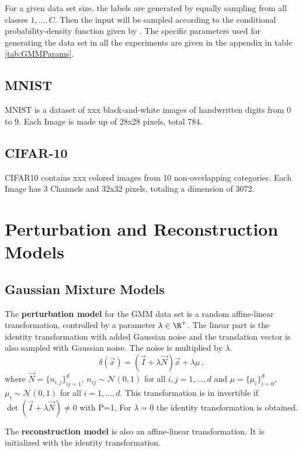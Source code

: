 For a given data set size, the labels are generated by equally sampling from all classes $1, \ldots, C$.
Then the input will be sampled according to the conditional probability-density function given by .
The specific parameters used for generating the data set in all the experiments
are given in the appendix  in table \ref{tab:GMMParams}.



\subsection{MNIST}
MNIST is a dataset of xxx black-and-white images of handwritten digits from 0 to 9. 
Each Image is made up of 28x28 pixels, total 784.

\subsection{CIFAR-10}
CIFAR10 contains xxx colored images from 10 non-overlapping categories.
Each Image has 3 Channels and 32x32 pixels, totaling a dimension of 3072.





\section{Perturbation and Reconstruction Models}


\subsection{Gaussian Mixture Models}

The \textbf{perturbation model} for the GMM data set is
a random affine-linear transformation, controlled by a parameter $\lambda \in \R^+$.
The linear part is the identity transformation with added Gaussian noise
and the translation vector is also sampled with Gaussian noise.
The noise is multiplied by $\lambda$.
\[
    \delta(\vec x) = (\vec I + \lambda \vec N)\vec x + \lambda \mu \,,
\]
where $\vec N = \{n_{i, j}\}_{i j = 1}^{d}$, $n_{ij} \sim \mathcal N (0, 1)$ for all $i, j = 1 , \ldots, d$
and 
$\mu = \{\mu_i\}_{i=0}^d$, $\mu_i \sim \mathcal N(0, 1)$ for all $i=1,\ldots,d$.
This transformation is in invertible if $\det (\vec I + \lambda \vec N) \neq 0$ with P=1,
For $\lambda = 0$ the identity transformation is obtained.

The \textbf{reconstruction model} is also an affine-linear transformation. 
It is initialized with the identity transformation.

